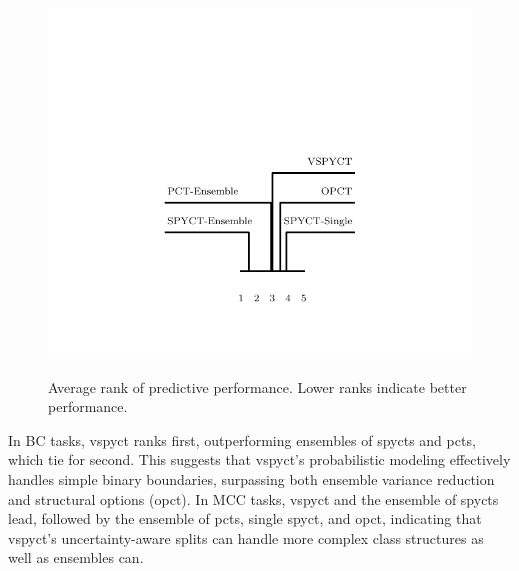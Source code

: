 \documentclass[3p,review,authoryear]{elsarticle}
\begin{document}
\begin{figure}[h!]
{        \includegraphics{critical_distance_str_2.pdf}
        \label{fig:subfig3}
    }
    \caption{Average rank of predictive performance. Lower ranks indicate better performance.}
    \label{fig:avg_rank}
\end{figure}

In BC tasks, \gls{vspyct} ranks first, outperforming ensembles of \glspl{spyct} and \glspl{pct}, which tie for second. This suggests that \gls{vspyct}’s probabilistic modeling effectively handles simple binary boundaries, surpassing both ensemble variance reduction and structural options (\gls{opct}).
In MCC tasks, \gls{vspyct} and the ensemble of \glspl{spyct} lead, followed by the ensemble of \glspl{pct}, single \gls{spyct}, and \gls{opct}, indicating that \gls{vspyct}’s uncertainty-aware splits can handle more complex class structures as well as ensembles can.
\end{document}
